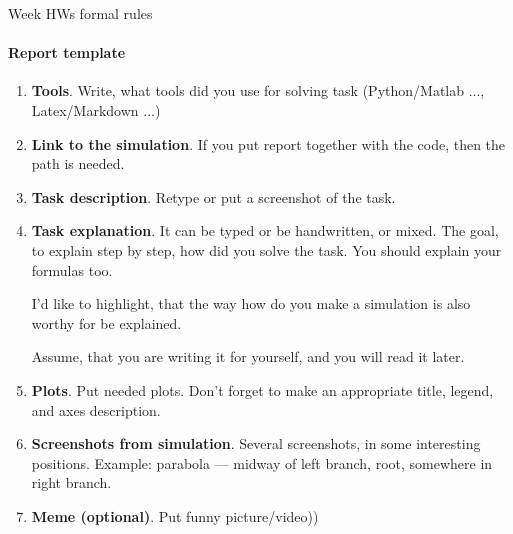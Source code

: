 \documentclass[aspectratio=169]{beamer}
\begin{document}
    \begin{frame}[t]{Week HWs formal rules}
    \framesubtitle{Report template}
        \begin{enumerate}
            \footnotesize
            \item \textbf{Tools}. Write, what tools did you use for solving task (Python/Matlab ..., Latex/Markdown ...)
            \item \textbf{Link to the simulation}. If you put report together with the code, then the path is needed.
            \item \textbf{Task description}. Retype or put a screenshot of the task.
            \item \textbf{Task explanation}. It can be typed or be handwritten, or mixed. The goal, to explain step by step, how did you solve the task. You should explain your formulas too.

            I'd like to highlight, that the way how do you make a simulation is also worthy for be explained.

            Assume, that you are writing it for yourself, and you will read it later.
            \item \textbf{Plots}. Put needed plots. Don't forget to make an appropriate title, legend, and axes description.
            \item \textbf{Screenshots from simulation}. Several screenshots, in some interesting positions. Example: parabola --- midway of left branch, root, somewhere in right branch.
            \item \textbf{Meme (optional)}. Put funny picture/video))
        \end{enumerate}
    \end{frame}
\end{document}
